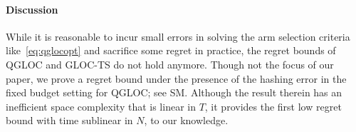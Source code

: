 \vspace{-6pt}
\paragraph{Discussion}

While it is reasonable to incur small errors in solving the arm selection criteria like~\eqref{eq:qglocopt} and sacrifice some regret in practice, the regret bounds of QGLOC and GLOC-TS do not hold anymore. %
Though not the focus of our paper, we prove a regret bound under the presence of the hashing error in the fixed budget setting for QGLOC; see SM.
Although the result therein has an inefficient space complexity that is linear in $T$, it provides the first low regret bound with time sublinear in $N$, to our knowledge.

